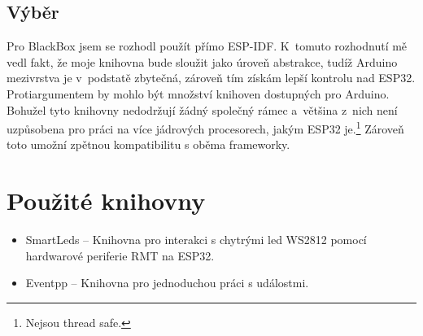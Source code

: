 \subsection{Výběr}

Pro BlackBox jsem se rozhodl použít přímo ESP-IDF.
K~tomuto rozhodnutí mě vedl fakt, že moje knihovna bude sloužit jako úroveň abstrakce, tudíž Arduino mezivrstva je v~podstatě zbytečná, zároveň tím získám lepší kontrolu nad ESP32.
Protiargumentem by mohlo být množství knihoven dostupných pro Arduino.
Bohužel tyto knihovny nedodržují žádný společný rámec a~většina z~nich není uzpůsobena pro práci na více jádrových procesorech, jakým ESP32 je.\footnote{Nejsou thread safe.}
Zároveň toto umožní zpětnou kompatibilitu s oběma frameworky.

\section{Použité knihovny}

\begin{itemize}
    \item SmartLeds \cite{SmartLeds} --
        Knihovna pro interakci s chytrými led WS2812 pomocí hardwarové periferie RMT na ESP32. %
    \item Eventpp --
        Knihovna pro jednoduchou práci s událostmi.
\end{itemize}